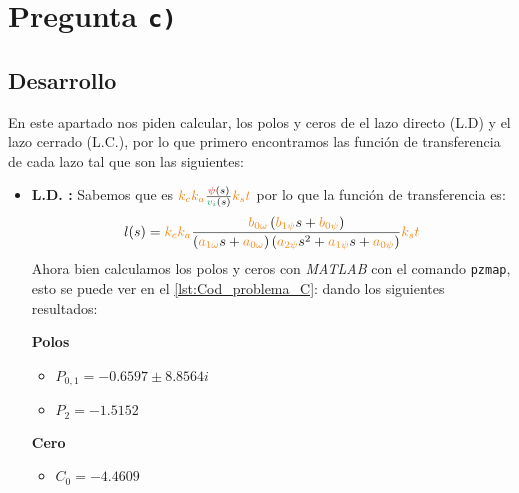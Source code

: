 \section{Pregunta \texttt{c)}}\label{pregunta-c}
\subsection{Desarrollo}

En este apartado nos piden calcular, los polos y ceros de el lazo directo (L.D) 
y el lazo cerrado (L.C.), por lo que primero encontramos las función de 
transferencia de cada lazo tal que son las siguientes:

\begin{itemize}
    \item \textbf{L.D. :} Sabemos que es \( \nara{k_c k_a} \frac{\rojo{\psi}(s)}{\verd{v_i}(s)}\nara{k_st} \) por lo que la función de transferencia es:
    \begin{equation}
        l(s)= \nara{k_ck_a} \frac{\nara{\nara{b_{0\omega}}}\left(\nara{b_{1\psi}}s + \nara{b_{0\psi}}\right)}
        {\left(\nara{a_{1\omega}}s + \nara{a_{0\omega}}\right)\left(\nara{a_{2\psi}}s^{2} + \nara{a_{1\psi}}s + \nara{a_{0\psi}}\right)} \nara{k_st}
    \end{equation}
    Ahora bien calculamos los polos y ceros con \textit{MATLAB} con el comando \verb|pzmap|, esto se puede ver en el \autoref{lst:Cod_problema_C}: dando los siguientes resultados:

\begin{multicols}{2}
    \textbf{Polos}
    \begin{itemize}
        \item \(P_{0,1} = -0.6597 \pm 8.8564i\) 
        \item \(P_2 = -1.5152 \)
    \end{itemize}
    \columnbreak
    \textbf{Cero}
    \begin{itemize}
        \item \(C_0 = -4.4609\)
    \end{itemize}
  \end{multicols}


\end{itemize}
